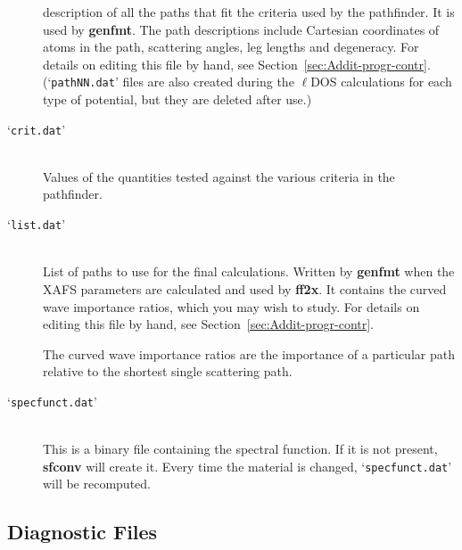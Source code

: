 \documentclass[11pt,oneside]{report} %
\newcommand{\file}[1]{`\texttt{#1}'}
\newcommand{\module}[1]{\textrm{\bf{#1}}}
\begin{document}
\begin{latexonly}
\begin{description}
  description of all the paths that fit the criteria used by the
  pathfinder. It is used by \module{genfmt}. The path descriptions include
  Cartesian coordinates of atoms in the path, scattering angles, leg
  lengths and degeneracy. For details on editing this file by hand, see
  Section~\ref{sec:Addit-progr-contr}. (\file{pathNN.dat} files are also
  created during the $\ell$DOS calculations for each type of potential, but
  they are deleted after use.)
\item[\file{crit.dat}]\hfill\\ Values of the quantities tested against the
  various criteria in the pathfinder.
\item[\file{list.dat}]\hfill\\ List of paths to use for the final calculations.
  Written by \module{genfmt} when the XAFS parameters are calculated and used
  by \module{ff2x}. It contains the curved wave importance ratios, which
  you may wish to study. For details on editing this file by hand, see
  Section~\ref{sec:Addit-progr-contr}.

  The curved wave importance ratios are the importance of a particular
  path relative to the shortest single scattering path.
\item[\file{specfunct.dat}]\hfill\\ This is a binary file containing the 
  spectral function. If it is not present, \module{sfconv} will create it. Every 
  time the material is changed, \file{specfunct.dat} will be recomputed.
\end{description}



\subsection{Diagnostic Files}
\label{sec:Diagn-Files-from}


\end{latexonly}
\end{document}

